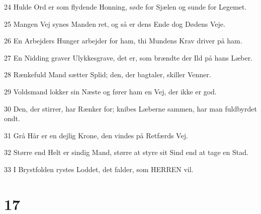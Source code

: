 \par 24 Hulde Ord er som flydende Honning, søde for Sjælen og sunde for Legemet.
\par 25 Mangen Vej synes Manden ret, og så er dens Ende dog Dødens Veje.
\par 26 En Arbejders Hunger arbejder for ham, thi Mundens Krav driver på ham.
\par 27 En Nidding graver Ulykkesgrave, det er, som brændte der Ild på hans Læber.
\par 28 Rænkefuld Mand sætter Splid; den, der bagtaler, skiller Venner.
\par 29 Voldsmand lokker sin Næste og fører ham en Vej, der ikke er god.
\par 30 Den, der stirrer, har Rænker for; knibes Læberne sammen, har man fuldbyrdet ondt.
\par 31 Grå Hår er en dejlig Krone, den vindes på Retfærds Vej.
\par 32 Større end Helt er sindig Mand, større at styre sit Sind end at tage en Stad.
\par 33 I Brystfolden rystes Loddet, det falder, som HERREN vil.

\chapter{17}

